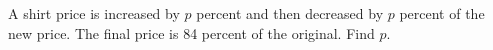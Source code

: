 A shirt price is increased by $p$ percent and then decreased by $p$ percent of the new price. The final price is 84 percent of the original. Find $p$.
